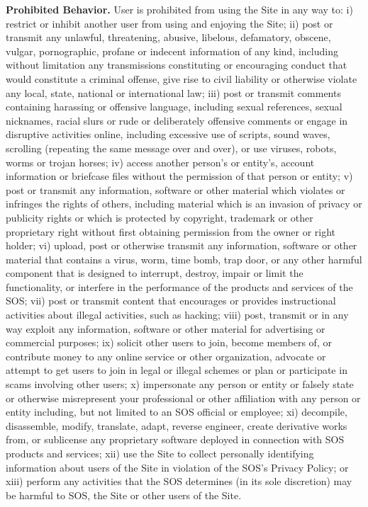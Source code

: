 \textbf{Prohibited Behavior.}
User is prohibited from using the Site in any way to:
i) restrict or inhibit another user from using and enjoying the Site;
ii) post or transmit any unlawful, threatening, abusive, libelous, defamatory,
obscene, vulgar, pornographic, profane or indecent information of any kind,
including without limitation any transmissions constituting or encouraging
conduct that would constitute a criminal offense, give rise to civil liability
or otherwise violate any local, state, national or international law;
iii) post or transmit comments containing harassing or offensive language,
including sexual references, sexual nicknames, racial slurs or rude or
deliberately offensive comments or engage in disruptive activities online,
including excessive use of scripts, sound waves, scrolling (repeating the same
message over and over), or use viruses, robots, worms or trojan horses;
iv) access another person's or entity's, account information or briefcase files
without the permission of that person or entity;
v) post or transmit any information, software or other material which violates
or infringes the rights of others, including material which is an invasion of
privacy or publicity rights or which is protected by copyright, trademark or
other proprietary right without first obtaining permission from the owner or
right holder;
vi) upload, post or otherwise transmit any information, software or other
material that contains a virus, worm, time bomb, trap door, or any other harmful
component that is designed to interrupt, destroy, impair or limit the
functionality, or interfere in the performance of the products and services of
the SOS;
vii) post or transmit content that encourages or provides instructional
activities about illegal activities, such as hacking;
viii) post, transmit or in any way exploit any information, software or other
material for advertising or commercial purposes;
ix) solicit other users to join, become members of, or contribute money to any
online service or other organization, advocate or attempt to get users to join
in legal or illegal schemes or plan or participate in scams involving other
users;
x) impersonate any person or entity or falsely state or otherwise misrepresent
your professional or other affiliation with any person or entity including, but
not limited to an SOS official or employee;
xi) decompile, disassemble, modify, translate, adapt, reverse engineer, create
derivative works from, or sublicense any proprietary software deployed in
connection with SOS products and services;
xii) use the Site to collect personally identifying information about users of
the Site in violation of the SOS's Privacy Policy; or xiii) perform any
activities that the SOS determines (in its sole discretion) may be harmful to
SOS, the Site or other users of the Site.